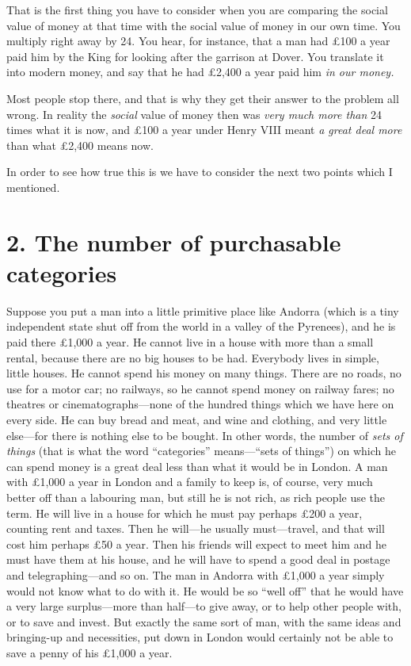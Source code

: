 \documentclass{book}
\begin{document}
That is the first thing you have to consider when you are comparing the social value of money at that time with the social value of money in our own time. You multiply right away by 24. You hear, for instance, that a man had £100 a year paid him by the King for looking after the garrison at Dover. You translate it into modern money, and say that he had £2,400 a year paid him \emph{in our money.}

Most people stop there, and that is why they get their answer to the problem all wrong. In reality the \emph{social} value of money then was \emph{very much more than} 24 times what it is now, and £100 a year under Henry VIII meant \emph{a great deal more} than what £2,400 means now.

In order to see how true this is we have to consider the next two points which I mentioned.

\section*{2. The number of purchasable categories}
Suppose you put a man into a little primitive place like Andorra (which is a tiny independent state shut off from the world in a valley of the Pyrenees), and he is paid there £1,000 a year. He cannot live in a house with more than a small rental, because there are no big houses to be had. Everybody lives in simple, little houses. He cannot spend his money on many things. There are no roads, no use for a motor car; no railways, so he cannot spend money on railway fares; no theatres or cinematographs—none of the hundred things which we have here on every side. He can buy bread and meat, and wine and clothing, and very little else—for there is nothing else to be bought. In other words, the number of \emph{sets of things} (that is what the word “categories” means—“sets of things”) on which he can spend money is a great deal less than what it would be in London. A man with £1,000 a year in London and a family to keep is, of course, very much better off than a labouring man, but still he is not rich, as rich people use the term. He will live in a house for which he must pay perhaps £200 a year, counting rent and taxes. Then he will—he usually must—travel, and that will cost him perhaps £50 a year. Then his friends will expect to meet him and he must have them at his house, and he will have to spend a good deal in postage and telegraphing—and so on. The man in Andorra with £1,000 a year simply would not know what to do with it. He would be so “well off” that he would have a very large surplus—more than half—to give away, or to help other people with, or to save and invest. But exactly the same sort of man, with the same ideas and bringing-up and necessities, put down in London would certainly not be able to save a penny of his £1,000 a year.
\end{document}
